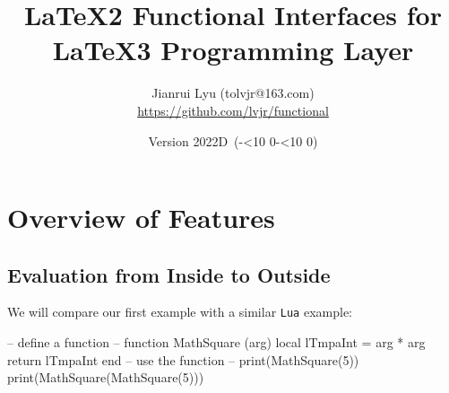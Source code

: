 \documentclass[oneside]{book}
\newcommand*{\myversion}{2022D}
\newcommand*{\mydate}{Version \myversion\ (\the\year-\mylpad\month-\mylpad\day)}
\newcommand*{\mylpad}[1]{\ifnum#1<10 0\the#1\else\the#1\fi}
\begin{document}
\title{\sffamily LaTeX2 \textcolor{green3}{Functional} Interfaces for LaTeX3 Programming Layer}
\author{Jianrui Lyu (tolvjr@163.com)\\\url{https://github.com/lvjr/functional}}
\date{\mydate\vspace{1cm}\\\myabstract\vspace{10cm}}

\newcommand\myabstract{\parbox{\linewidth}{\hrule\vspace{0.8em}\large
LaTeX3 programming layer (\textsf{expl3}) is very powerful for advanced users,
but it is a little complicated for normal users.
This \textcolor{green3}{\sffamily functional} package aims to provide
intuitive LaTeX2 functional interfaces for it.
\par\vspace{0.5em}
Although there are functions in LaTeX3, the evaluation of them is from outside to inside.
With this package, the evaluation of functions is from inside to outside,
which is the same as other programming languages such as \texttt{JavaScript} or \texttt{Lua}.
In this way, it is rather easy to debug code too.
\par\vspace{0.5em}
Note that many paragraphs in this manual are copied from the documentation of \textsf{expl3}.
\par\vspace{0.8em}\hrule}}

{\let\newpage\relax\vspace{-4cm}\maketitle}

\tableofcontents

\chapter{Overview of Features}

\section{Evaluation from Inside to Outside}

We will compare our first example with a similar \verb!Lua! example:

\begin{minipage}{0.55\textwidth}
\begin{codehigh}
\IgnoreSpacesOn
\PrgNewFunction {} {
  \IntSet {}
  \Return { \Value \lTmpaInt }
}
\IgnoreSpacesOff
{}
\end{codehigh}
\end{minipage}%
\begin{minipage}{0.45\textwidth}
\begin{code}
-- define a function --
function MathSquare (arg)
  local lTmpaInt = arg * arg
  return lTmpaInt
end
-- use the function --
print(MathSquare(5))
print(MathSquare(MathSquare(5)))
\end{code}
\end{minipage}
\end{document}
